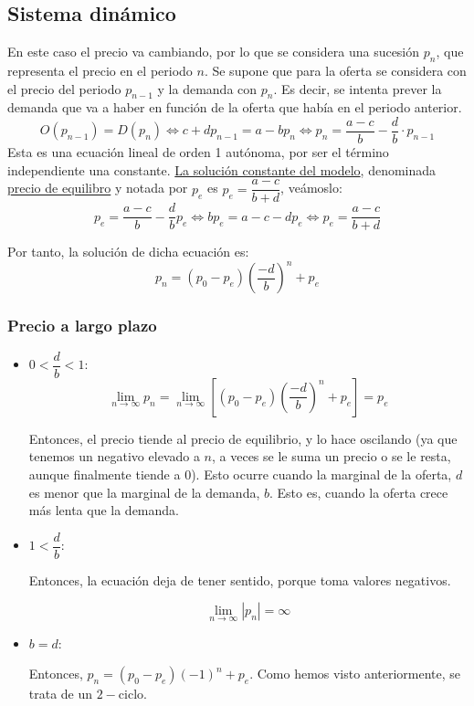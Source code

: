 \subsection{Sistema dinámico}
En este caso el precio va cambiando, por lo que se considera una sucesión $p_n$, que representa el precio en el periodo $n$. Se supone que para la oferta se considera con el precio del periodo $p_{n-1}$ y la demanda con $p_n$. Es decir, se intenta prever la demanda que va a haber en función de la oferta que había en el periodo anterior.
\begin{equation*}
    O(p_{n-1}) = D(p_n) \Longleftrightarrow
    c + dp_{n-1} = a-bp_n \Longleftrightarrow
    p_n = \dfrac{a-c}{b}-\dfrac{d}{b}\cdot p_{n-1}
\end{equation*}
Esta es una ecuación lineal de orden 1 autónoma, por ser el término independiente una constante. \underline{La solución constante del modelo}, denominada \ul{precio de equilibro} y notada por $p_e$ es $p_e=\dfrac{a-c}{b+d}$, veámoslo:
\begin{equation*}
    p_e = \dfrac{a-c}{b}-\dfrac{d}{b}p_e \Longleftrightarrow
    bp_e = a-c -dp_e \Longleftrightarrow
    p_e = \frac{a-c}{b+d}
\end{equation*}

Por tanto, la solución de dicha ecuación es:
$$p_n = (p_0 - p_e)\left(\dfrac{-d}{b}\right)^n + p_e $$

\subsubsection{Precio a largo plazo}
\begin{itemize}
    \item $0<\dfrac{d}{b}<1$:
    \begin{equation*}
        \lim_{n\to \infty} p_n = \lim_{n\to \infty} \left[(p_0 - p_e)\left(\dfrac{-d}{b}\right)^n + p_e \right]= p_e
    \end{equation*}
    
    Entonces, el precio tiende al precio de equilibrio, y lo hace oscilando (ya que tenemos un negativo elevado a $n$, a veces se le suma un precio o se le resta, aunque finalmente tiende a $0$).
    Esto ocurre cuando la marginal de la oferta, $d$ es menor que la marginal de la demanda, $b$. Esto es, cuando la oferta crece más lenta que la demanda.

    \item $1<\dfrac{d}{b}$:

    Entonces, la ecuación deja de tener sentido, porque toma valores negativos.

    \begin{equation*}
        \lim_{n\to\infty} |p_n| = \infty
    \end{equation*}

    \item $b=d$:

    Entonces, $p_n = (p_0 - p_e)\left(-1\right)^n + p_e$. Como hemos visto anteriormente, se trata de un $2-$ciclo.
\end{itemize}

